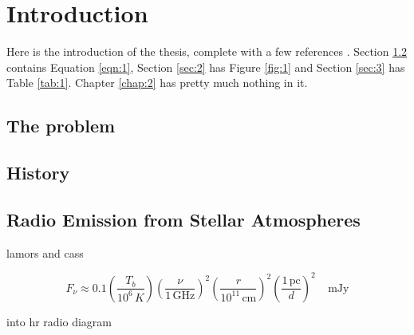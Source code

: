 \chapter{Introduction}
\label{chap:1}


\label{chap:1}
 
 
Here is the introduction of the thesis, complete with a few references  \citep{sagan1997demon, prothero2007evolution}.  Section \ref{sec:1} contains Equation \ref{eqn:1}, Section \ref{sec:2} has Figure \ref{fig:1} and Section \ref{sec:3} has Table \ref{tab:1}. Chapter \ref{chap:2} has pretty much nothing in it.
\pagebreak
\section{The problem}\label{sec:1}
\section{History}\label{sec:1}
 
\section{Radio Emission from Stellar Atmospheres} 
lamors and cass

\begin{equation}
F_{\nu}\approx 0.1\left(\frac{T_{b}}{10^6\,K}\right)\left(\frac{\nu}{1\,\mathrm{GHz}}\right)^2\left(\frac{r}{10^{11}\,\mathrm{cm}}\right)^2\left(\frac{1\,\mathrm{pc}}{d}\right)^2\ \ \ \ \ \mathrm{mJy}
\end{equation}
\citep{gudel_2002}

into hr radio diagram
